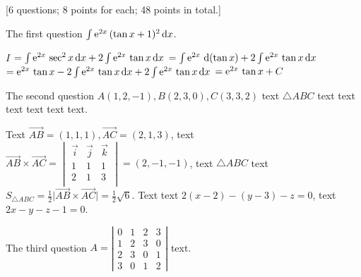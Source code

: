 \documentclass[12pt,math=all]{randexam}
\begin{document}
\bigskip

\newpage

[6 questions; 8 points for each; 48 points in total.]

\begin{question}
The first question $\int\mathrm{e}^{2x}\,(\tan x+1)^2\mathop{}\!\mathrm{d} x$.
\end{question}

\smallskip

\begin{solution}
$I$ \? $=\int\mathrm{e}^{2x}\,\sec^2 x\mathop{}\!\mathrm{d} x+2\int\mathrm{e}^{2x}\,\tan x\mathop{}\!\mathrm{d} x$ 
\+ $=\int\e^{2x}\,\d(\tan x)+ 2\int\e^{2x}\,\tan x\dx$ 
\+ $=\mathrm{e}^{2x}\,\tan x - 2\int\mathrm{e}^{2x}\,\tan x\mathop{}\!\mathrm{d} x+ 2\int\mathrm{e}^{2x}\,\tan x\mathop{}\!\mathrm{d} x$ 
\+ $=\mathrm{e}^{2x}\,\tan x + C$ 
\end{solution}

\vfill

\begin{question}
The second question $A(1,2,-1), B(2,3,0),C(3,3,2)$ text $\triangle ABC$ text text text text text text.
\end{question}

\smallskip

\begin{solution}
Text $\overrightarrow{AB}=(1,1,1),\overrightarrow{AC}=(2,1,3)$, 
text $\overrightarrow{AB}\times \overrightarrow{AC}=\begin{vmatrix}
\vec{i}&\vec{j} &\vec{k}\\
1&1&1\\
2&1&3\\
\end{vmatrix}=(2,-1,-1)$, 
text $\triangle ABC$ text $S_{\triangle ABC}=\frac{1}{2}\big|\overrightarrow{AB}\times
\overrightarrow{AC}\big|=\frac{1}{2}\sqrt{6}.$ 
Text text $2(x-2)-(y-3)-z=0$, text $2x-y-z-1=0$. 
\end{solution}

\vfill

\newpage

\begin{question}
The third question $A = \left|\begin{array}{cccc}
  0 & 1 & 2 & 3\\
  1 & 2 & 3 & 0\\
  2 & 3 & 0 & 1\\
  3 & 0 & 1 & 2
\end{array}\right|$ text.
\end{question}
\end{document}
